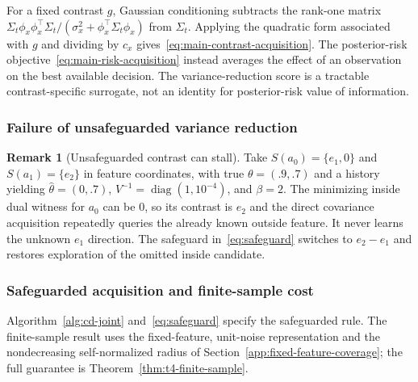 \documentclass{article}
\theoremstyle{plain}
\theoremstyle{definition}
\newtheorem{remark}[theorem]{Remark}
\begin{document}
For a fixed contrast $g$, Gaussian conditioning subtracts the rank-one matrix $\Sigma_t\phi_x\phi_x^\top\Sigma_t/(\sigma_x^2+\phi_x^\top\Sigma_t\phi_x)$ from $\Sigma_t$. Applying the quadratic form associated with $g$ and dividing by $c_x$ gives~\eqref{eq:main-contrast-acquisition}. The posterior-risk objective~\eqref{eq:main-risk-acquisition} instead averages the effect of an observation on the best available decision. The variance-reduction score is a tractable contrast-specific surrogate, not an identity for posterior-risk value of information.

\subsubsection{Failure of unsafeguarded variance reduction}

\begin{remark}[Unsafeguarded contrast can stall]
Take $S(a_0)=\{e_1,0\}$ and $S(a_1)=\{e_2\}$ in feature
coordinates, with true $\theta=(.9,.7)$ and a history yielding
$\widehat\theta=(0,.7)$, $V^{-1}=\operatorname{diag}(1,10^{-4})$,
and $\beta=2$. The minimizing inside dual witness for $a_0$
can be $0$, so its contrast is $e_2$ and the direct covariance
acquisition repeatedly queries the already known outside feature.
It never learns the unknown $e_1$ direction.
The safeguard in~\eqref{eq:safeguard} switches to $e_2-e_1$ and
restores exploration of the omitted inside candidate.
\end{remark}

\subsubsection{Safeguarded acquisition and finite-sample cost}

Algorithm~\ref{alg:cd-joint} and~\eqref{eq:safeguard} specify the safeguarded rule. The finite-sample result uses the fixed-feature, unit-noise representation and the nondecreasing self-normalized radius of Section~\ref{app:fixed-feature-coverage}; the full guarantee is Theorem~\ref{thm:t4-finite-sample}.
\end{document}
